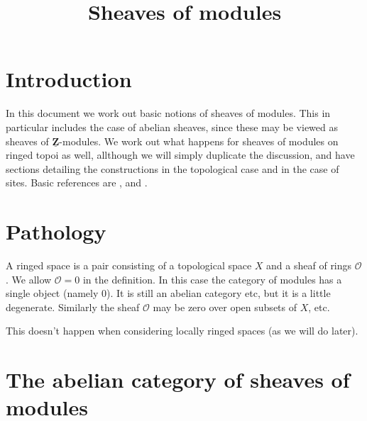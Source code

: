

%


\title{Sheaves of modules}


\maketitle

\label{section-phantom}

\tableofcontents

\section{Introduction}
\label{section-introduction}

\noindent
In this document we work out basic notions of sheaves of modules.
This in particular includes the case of abelian sheaves, since
these may be viewed as sheaves of $\underline{\mathbf{Z}}$-modules.
We work out what happens for sheaves of modules on ringed topoi
as well, allthough we will simply duplicate the discussion,
and have sections detailing the constructions in the topological
case and in the case of sites.
Basic references are \cite{FAC}, \cite{EGA} and \cite{SGA4}.





\section{Pathology}
\label{section-pathology}

\noindent
A ringed space is a pair consisting of a topological space $X$
and a sheaf of rings $\mathcal{O}$. We allow $\mathcal{O} = 0$
in the definition. In this case the category of modules has a
single object (namely $0$). It is still an abelian category etc,
but it is a little degenerate. Similarly the sheaf $\mathcal{O}$
may be zero over open subsets of $X$, etc.

\medskip\noindent
This doesn't happen when considering locally ringed spaces (as we
will do later).








\section{The abelian category of sheaves of modules}
\label{section-kernels}


